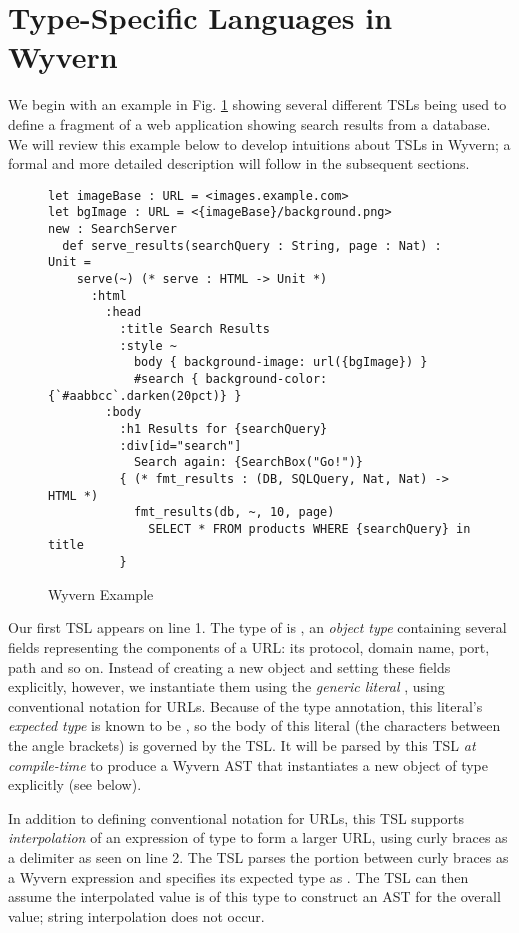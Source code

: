 
\section{Type-Specific Languages in Wyvern}
\label{s:motivation}
We begin with an example in Fig. \ref{f-example} showing several different TSLs being used to define a fragment of a web application showing search results from a database. We will review this example below to develop intuitions about TSLs in Wyvern; a formal and more detailed description will follow in the subsequent sections.
\begin{figure}[t]
\begin{lstlisting}
let imageBase : URL = <images.example.com>
let bgImage : URL = <{imageBase}/background.png>
new : SearchServer
  def serve_results(searchQuery : String, page : Nat) : Unit =
    serve(~) (* serve : HTML -> Unit *)
      :html
        :head
          :title Search Results
          :style ~
            body { background-image: url({bgImage}) }
            #search { background-color: {`#aabbcc`.darken(20pct)} }
        :body
          :h1 Results for {searchQuery}
          :div[id="search"]
            Search again: {SearchBox("Go!")}
          { (* fmt_results : (DB, SQLQuery, Nat, Nat) -> HTML *)
            fmt_results(db, ~, 10, page)
              SELECT * FROM products WHERE {searchQuery} in title
          }
\end{lstlisting}
\vspace{-10px}
\caption{Wyvern Example }
\label{f-example}
\end{figure}
 
Our first TSL appears on line 1. The type of  is , an \emph{object type} containing several fields representing the components of a URL: its protocol, domain name, port, path and so on. Instead of creating a new object and setting these fields explicitly, however, we instantiate them using the \emph{generic literal} , using conventional notation for URLs. Because of the type annotation, this literal's \emph{expected type} is known to be , so the body of this literal (the characters between the angle brackets) is governed by the  TSL. It will be parsed by this TSL \emph{at compile-time} to produce a Wyvern AST that instantiates a new object of type  explicitly (see below).

In addition to defining conventional notation for URLs, this TSL supports \emph{interpolation} of an expression of type  to form a larger URL, using curly braces as a delimiter as seen on line 2. The TSL parses the portion between curly braces as a Wyvern expression and specifies its expected type as  . The TSL can then assume the interpolated value is of this type to construct an AST for the overall value; string interpolation does not occur.

